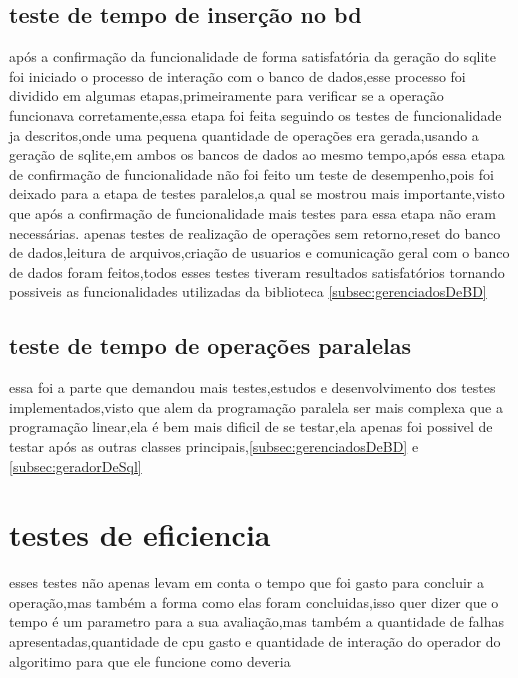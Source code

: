 \documentclass[
	12pt,				%
	openright,			%
	oneside,			%
	a4paper,			%
	english,			%
	french,				%
	spanish,			%
	brazil,				%
	]{abntex2}
\begin{document}
\subsection{teste de tempo de inserção no bd}
\label{subsec:teste de tempo de inserção no bd}
após a confirmação da funcionalidade de forma satisfatória da geração do sqlite foi iniciado o processo de interação com o banco de dados,esse processo foi dividido em algumas etapas,primeiramente para verificar se a operação funcionava corretamente,essa etapa foi feita seguindo os testes de funcionalidade ja descritos,onde uma pequena quantidade de operações era gerada,usando a geração de sqlite,em ambos os bancos de dados ao mesmo tempo,após essa etapa de confirmação de funcionalidade não foi feito um teste de desempenho,pois foi deixado para a etapa de testes paralelos,a qual se mostrou mais importante,visto que após a confirmação de funcionalidade mais testes para essa etapa não eram necessárias.
apenas testes de realização de operações sem retorno,reset do banco de dados,leitura de arquivos,criação de usuarios e comunicação geral com o banco de dados foram feitos,todos esses testes tiveram resultados satisfatórios tornando possiveis as funcionalidades utilizadas da biblioteca \autoref{subsec:gerenciadosDeBD}

\subsection{teste de tempo de operações paralelas}
\label{subsec:teste de tempo de operações paralelas}
essa foi a parte que demandou mais testes,estudos e desenvolvimento dos testes implementados,visto que alem da programação paralela ser mais complexa que a programação linear,ela é bem mais dificil de se testar,ela apenas foi possivel de testar após as outras classes principais,\autoref{subsec:gerenciadosDeBD} e \autoref{subsec:geradorDeSql}

\section{testes de eficiencia}
\label{sec:testes de eficiencia}
esses testes não apenas levam em conta o tempo que foi gasto para concluir a operação,mas também a forma como elas foram concluidas,isso quer dizer que o tempo é um parametro para a sua avaliação,mas também a quantidade de falhas apresentadas,quantidade de cpu gasto e quantidade de interação do operador do algoritimo para que ele funcione como deveria
\end{document}
